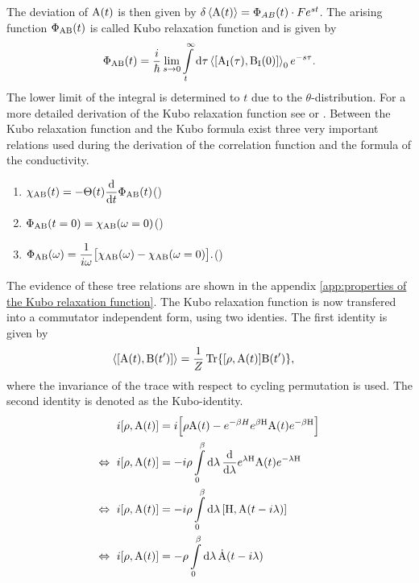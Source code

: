 The deviation of $\mathrm{A}(t)$ is then given by $\delta\expval{\mathrm{A}(t)} = \Phi_{AB}(t) \cdot F e^{st}$.
The arising function $\Phi_{\mathrm{AB}}(t)$ is called Kubo relaxation function and is given by
%
\begin{align}
	\Phi_{\mt{AB}}(t) = \frac{i}{\hbar} \lim\limits_{s \to 0} \int\limits_{t}^{\infty} \dd{\tau} \expval{\comm{\mt{A}_{\mt{I}}(\tau)}{\mt{B}_{\mt{I}}(0)}}_{0} e^{-s\tau}.
	\label{eq:Kubo relaxation function}
\end{align}
%
The lower limit of the integral is determined to $t$ due to the $\theta$-distribution.
For a more detailed derivation of the Kubo relaxation function see \cite{Schwabl} or \cite{Schwabl2}.
Between the Kubo relaxation function and the Kubo formula exist three very important relations used during the derivation of the correlation function and the formula of the conductivity.
%
\begin{enumerate}
	\item $\begin{aligned}[t] \chi_{\mathrm{AB}}(t) = -\Theta(t) \dv{t} \Phi_{\mathrm{AB}}(t) \end{aligned}$\hfill {}(\theequation)\label{eq:relation 1 between Phi and chi}
	\item $\begin{aligned}[t] \Phi_{\mathrm{AB}}(t = 0) = \chi_{\mathrm{AB}}(\omega = 0) \end{aligned}$\hfill {}(\theequation)\label{eq:relation 2 between Phi and chi}
	\item $\begin{aligned}[t] \Phi_{\mathrm{AB}}(\omega) = \frac{1}{i\omega}\big[\chi_{\mathrm{AB}}(\omega) - \chi_{\mathrm{AB}}(\omega = 0)\big]. \end{aligned}$\hfill {}(\theequation)\label{eq:relation 3 between Phi and chi}
\end{enumerate}
%
The evidence of these tree relations are shown in the appendix \ref{app:properties of the Kubo relaxation function}.
The Kubo relaxation function is now transfered into a commutator independent form, using two identies.
The first identity is given by
%
\begin{align}
	\expval{\comm{\mt{A}(t)}{\mt{B}(t')}} &= \frac{1}{Z} \Tr{\comm{\rho}{\mt{A}(t)} \mt{B}(t')},
	\label{eq:identity expectation value}
\end{align}
%
where the invariance of the trace with respect to cycling permutation is used.
The second identity is denoted as the Kubo-identity.
%
\begin{align}
	i \comm{\rho}{\mt{A}(t)} &= i \Big[\rho \mt{A}(t) - e^{-\beta H} e^{\beta \mt{H}} \mt{A}(t) e^{-\beta \mt{H}}\Big]
	\notag \\
	\Leftrightarrow\ i \comm{\rho}{\mt{A}(t)} &= -i \rho \int\limits_{0}^{\beta} \dd{\lambda} \dv{\lambda} e^{\lambda \mt{H}} \mt{A}(t) e^{-\lambda \mt{H}}
	\notag \\
	\Leftrightarrow\ i \comm{\rho}{\mt{A}(t)} &= -i \rho \int\limits_{0}^{\beta} \dd{\lambda} \comm{\mt{H}}{\mt{A}(t-i\lambda)}
	\notag \\
	\Leftrightarrow\ i \comm{\rho}{\mt{A}(t)} &= -\rho \int\limits_{0}^{\beta} \dd{\lambda} \dot{\mt{A}}(t-i\lambda)
	\label{eq:Kubo-identity}
\end{align}
